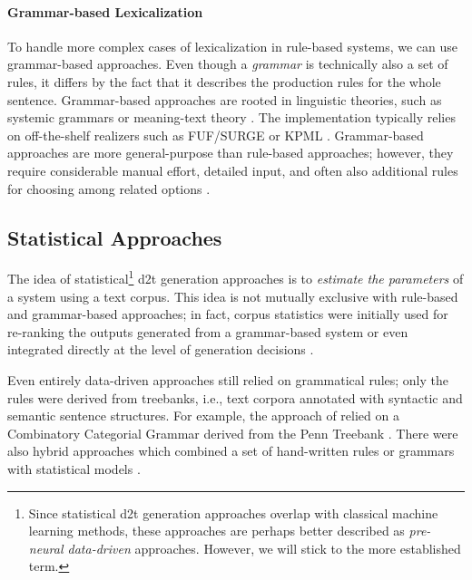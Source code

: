 {\paragraph{Grammar-based Lexicalization}
To handle more complex cases of lexicalization in rule-based systems, we can use grammar-based approaches. Even though a \emph{grammar} is technically also a set of rules, it differs by the fact that it describes the production rules for the whole sentence.
Grammar-based approaches are rooted in linguistic theories, such as systemic grammars \cite{halliday1985systemic,matthiessen1991lexico} or meaning-text theory \cite{mel1988dependency,goldberg1994using,milleModD2TMultilayerDataset2023}. The implementation typically relies on off-the-shelf realizers such as FUF/SURGE \cite{elhadad1997surge} or KPML \cite{bateman1997enabling}. Grammar-based approaches are more general-purpose than rule-based approaches; however, they require considerable manual effort, detailed input, and often also additional rules for choosing among related options \cite{gattSurveyStateArt2018}.


\subsection{Statistical Approaches}
\label{sec:stat-d2t}
The idea of statistical\footnote{Since statistical \ac{d2t} generation approaches overlap with classical machine learning methods, these approaches are perhaps better described as \emph{pre-neural data-driven} approaches. However, we will stick to the more established term.} \ac{d2t} generation approaches is to \emph{estimate the parameters} of a system using a text corpus. This idea is not mutually exclusive with rule-based and grammar-based approaches; in fact, corpus statistics were initially used for re-ranking the outputs generated from a grammar-based system \cite{bangalore2000corpus,langkilde2000forest,ratnaparkhi2000trainable} or even integrated directly at the level of generation decisions \cite{belz2008automatic}.

Even entirely data-driven approaches still relied on grammatical rules; only the rules were derived from treebanks, i.e., text corpora annotated with syntactic and semantic sentence structures. For example, the approach of \citet{white2007towards} relied on a Combinatory Categorial Grammar \cite{steedman2001syntactic} derived from the Penn Treebank \cite{hockenmaier2007ccgbank}. There were also hybrid approaches which combined a set of hand-written rules or grammars with statistical models \cite{konstas2012concept,gardent2017statistical}.

}
